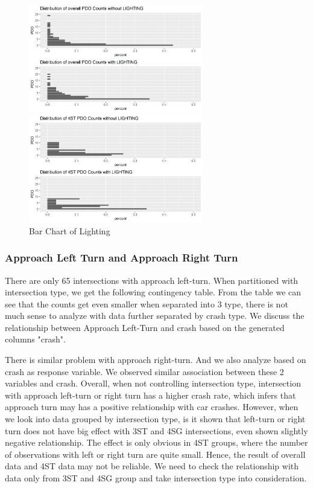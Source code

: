 \documentclass[11pt]{scrartcl} %
\begin{document}
\begin{figure}[H]
\begin{minipage}[t]{0.5\linewidth}
\centering
\includegraphics[width=3in]{image/LIGHTING_all_PDO.png}
\small
\end{minipage}
\begin{minipage}[t]{0.5\linewidth}
\centering
\includegraphics[width=3in]{image/LIGHTING_4ST_PDO.png}
\small
\end{minipage}
\caption{Bar Chart of Lighting}
\end{figure}

\subsubsection{Approach Left Turn and Approach Right Turn}

There are only 65 intersections with approach left-turn. When partitioned with intersection type, we get the following contingency table. From the table we can see that the counts get even smaller when separated into 3 type, there is not much sense to analyze with data further separated by crash type. We discuss the relationship between Approach Left-Turn and crash based on the generated columns "crash".

There is similar problem with approach right-turn. And we also analyze based on crash as response variable. We observed similar association between these 2 variables and crash. Overall, when not controlling intersection type, intersection with approach left-turn or right turn has a higher crash rate, which infers that approach turn may has a positive relationship with car crashes. However, when we look into data grouped by intersection type, is it shown that left-turn or right turn does not have big effect with 3ST and 4SG intersections, even shown slightly negative relationship. The effect is only obvious in 4ST groups, where the number of observations with left or right turn are quite small. Hence, the result of overall data and 4ST data may not be reliable. We need to check the relationship with data only from 3ST and 4SG group and take intersection type into consideration.
\end{document}
